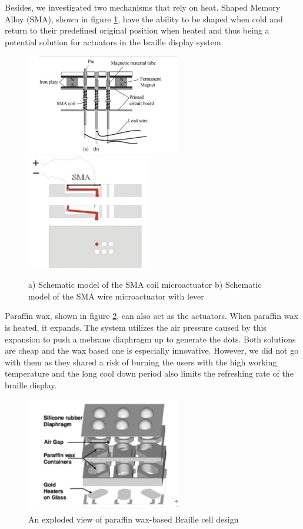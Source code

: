 Besides, we investigated two mechanisms that rely on heat. Shaped Memory Alloy (SMA), shown in figure \ref{fig:sma}, have the ability to be shaped when cold and return to their predefined original position when heated and thus being a potential solution for actuators in the braille display system.
\begin{figure}\centering
    \includegraphics[width=0.6\textwidth]{figures/sma-coil.png}
    \includegraphics[height=5cm]{figures/sma-mechanism.png}
\caption{ a) Schematic model of the SMA coil microactuator b) Schematic model of the SMA wire microactuator with lever}
\label{fig:sma}
\end{figure}

Paraffin wax, shown in figure \ref{fig:paraffin}, can also act as the actuators. When paraffin wax is heated, it expands. The system utilizes the air pressure caused by this expansion to push a mebrane diaphragm up to generate the dots. Both solutions are cheap and the wax based one is especially innovative. However, we did not go with them as they shared a risk of burning the users with the high working temperature and the long cool down period also limits the refreshing rate of the braille display.
\begin{figure} \centering
    \includegraphics[width=0.6\textwidth]{figures/paraffin.png}
\caption{An exploded view of paraffin wax-based Braille cell design}
\label{fig:paraffin}
\end{figure}

